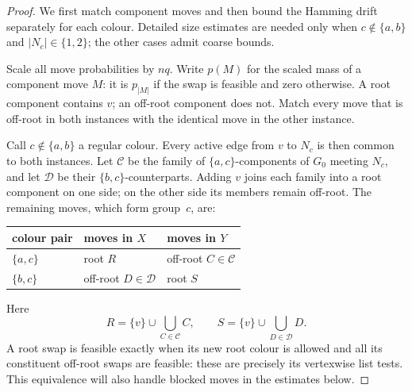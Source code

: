 \documentclass[11pt,reqno]{article}
\theoremstyle{plain}
\theoremstyle{definition}
\theoremstyle{remark}
\theoremstyle{definition}
\theoremstyle{remark}
\begin{document}
\begin{proof}
We first match component moves and then bound the Hamming drift
separately for each colour.  Detailed size estimates are needed only when
\(c\notin\{a,b\}\) and \(|N_c|\in\{1,2\}\); the other cases admit coarse
bounds.

Scale all move probabilities by \(nq\).  Write \(p(M)\) for the scaled
mass of a component move \(M\): it is \(p_{|M|}\) if the swap is feasible and
zero otherwise.  A root component contains \(v\); an off-root component
does not.  Match every move that is off-root in both instances with the
identical move in the other instance.

Call \(c\notin\{a,b\}\) a regular colour.  Every active edge from
\(v\) to \(N_c\) is then common to both instances.  Let \(\mathcal C\)
be the family of \(\{a,c\}\)-components of \(G_0\) meeting \(N_c\),
and let \(\mathcal D\) be their \(\{b,c\}\)-counterparts.  Adding
\(v\) joins each family into a root component on one side; on the other
side its members remain off-root.  The remaining moves, which form
group~\(c\), are:
\begin{center}
\begin{tabular}{@{}lll@{}}
\toprule
colour pair & moves in \(X\) & moves in \(Y\)\\
\midrule
\(\{a,c\}\) & root \(R\) & off-root \(C\in\mathcal C\)\\
\(\{b,c\}\) & off-root \(D\in\mathcal D\) & root \(S\)\\
\bottomrule
\end{tabular}
\end{center}
Here
\[
  R=\{v\}\cup\bigcup_{C\in\mathcal C}C,
  \qquad S=\{v\}\cup\bigcup_{D\in\mathcal D}D.
\]
A root swap is feasible exactly when its new root colour is allowed and
all its constituent off-root swaps are feasible: these are precisely its
vertexwise list tests.  This equivalence will also handle blocked moves
in the estimates below.


\end{proof}
\end{document}
